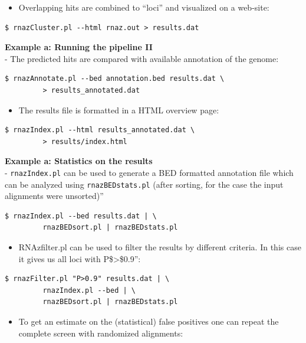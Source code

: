 \documentclass[]{article}
\providecommand{\tightlist}{%
  \setlength{\itemsep}{0pt}\setlength{\parskip}{0pt}}
\begin{document}
\begin{itemize}
\tightlist
\item
  Overlapping hits are combined to ``loci'' and visualized on a
  web-site:
\end{itemize}

\begin{verbatim}
$ rnazCluster.pl --html rnaz.out > results.dat
\end{verbatim}

\textbf{Example a: Running the pipeline II}\\
- The predicted hits are compared with available annotation of the
genome:

\begin{verbatim}
$ rnazAnnotate.pl --bed annotation.bed results.dat \
         > results_annotated.dat
\end{verbatim}

\begin{itemize}
\tightlist
\item
  The results file is formatted in a HTML overview page:
\end{itemize}

\begin{verbatim}
$ rnazIndex.pl --html results_annotated.dat \
         > results/index.html
\end{verbatim}

\textbf{Example a: Statistics on the results}\\
- \texttt{rnazIndex.pl} can be used to generate a BED formatted
annotation file which can be analyzed using \texttt{rnazBEDstats.pl}
(after sorting, for the case the input alignments were unsorted)''

\begin{verbatim}
$ rnazIndex.pl --bed results.dat | \
         rnazBEDsort.pl | rnazBEDstats.pl
\end{verbatim}

\begin{itemize}
\tightlist
\item
  RNAzfilter.pl can be used to filter the results by different criteria. In
  this case it gives us all loci with P\$\textgreater{}\$0.9'':
\end{itemize}

\begin{verbatim}
$ rnazFilter.pl "P>0.9" results.dat | \
         rnazIndex.pl --bed | \
         rnazBEDsort.pl | rnazBEDstats.pl
\end{verbatim}

\begin{itemize}
\tightlist
\item
  To get an estimate on the (statistical) false positives one can repeat
  the complete screen with randomized alignments:
\end{itemize}
\end{document}
